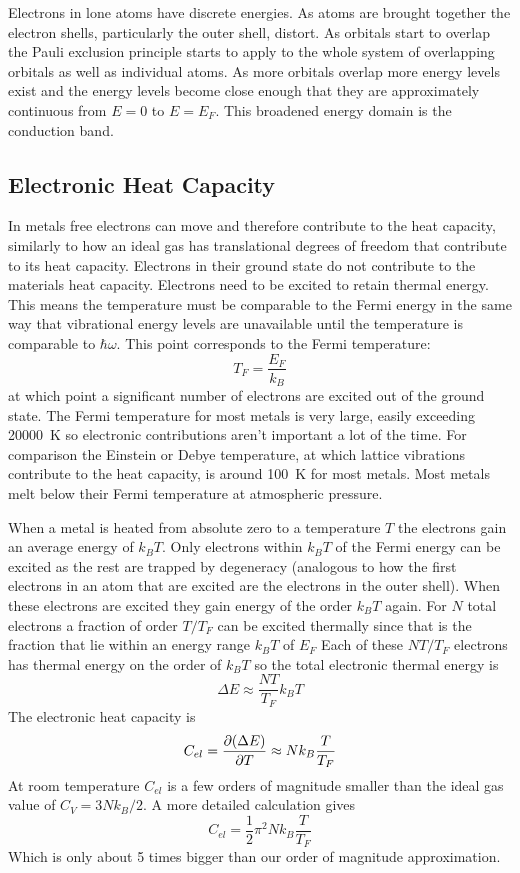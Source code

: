    Electrons in lone atoms have discrete energies.
    As atoms are brought together the electron shells, particularly the outer shell, distort.
    As orbitals start to overlap the Pauli exclusion principle starts to apply to the whole system of overlapping orbitals as well as individual atoms.
    As more orbitals overlap more energy levels exist and the energy levels become close enough that they are approximately continuous from \(E = 0\) to \(E = E_F\).
    This broadened energy domain is the conduction band.
    
    \subsection{Electronic Heat Capacity}
    In metals free electrons can move and therefore contribute to the heat capacity, similarly to how an ideal gas has translational degrees of freedom that contribute to its heat capacity.
    Electrons in their ground state do not contribute to the materials heat capacity.
    Electrons need to be excited to retain thermal energy.
    This means the temperature must be comparable to the Fermi energy in the same way that vibrational energy levels are unavailable until the temperature is comparable to \(\hbar\omega\).
    This point corresponds to the Fermi temperature:
    \[T_F = \frac{E_F}{k_B}\]
    at which point a significant number of electrons are excited out of the ground state.
    The Fermi temperature for most metals is very large, easily exceeding \SI{20000}{K} so electronic contributions aren't important a lot of the time.
    For comparison the Einstein or Debye temperature, at which lattice vibrations contribute to the heat capacity, is around \SI{100}{K} for most metals.
    Most metals melt below their Fermi temperature at atmospheric pressure.
    
    When a metal is heated from absolute zero to a temperature \(T\) the electrons gain an average energy of \(k_BT\).
    Only electrons within \(k_BT\) of the Fermi energy can be excited as the rest are trapped by degeneracy (analogous to how the first electrons in an atom that are excited are the electrons in the outer shell).
    When these electrons are excited they gain energy of the order \(k_BT\) again.
    For \(N\) total electrons a fraction of order \(T/T_F\) can be excited thermally since that is the fraction that lie within an energy range \(k_BT\) of \(E_F\)
    Each of these \(NT/T_F\) electrons has thermal energy on the order of \(k_BT\) so the total electronic thermal energy is
    \[\Delta E \approx \frac{NT}{T_F}k_BT\]
    The electronic heat capacity is
    \[C_{el} = \pdv{(\Delta E)}{T} \approx Nk_B\frac{T}{T_F}\]
    At room temperature \(C_{el}\) is a few orders of magnitude smaller than the ideal gas value of \(C_V = 3Nk_B/2\).
    A more detailed calculation gives
    \[C_{el} = \frac{1}{2}\pi^2 Nk_B\frac{T}{T_F}\]
    Which is only about 5 times bigger than our order of magnitude approximation.
    

